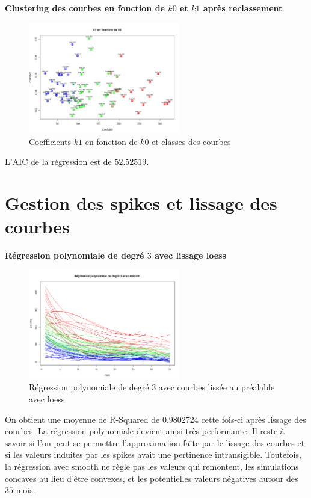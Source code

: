 \documentclass[12pt]{article}
\begin{document}
\textbf{Clustering des courbes en fonction de $k0$ et $k1$ apr\`es reclassement}

\begin{figure}[H]
 \centering %
	\includegraphics[width=250px]{clustering2}
  \caption{\label{fig:k0_k1} Coefficients $k1$ en fonction de $k0$ et classes des courbes}
\end{figure}

L'AIC de la r\'egression est de $52.52519$.


\newpage

\section{Gestion des spikes et lissage des courbes}

\textbf{R\'egression polynomiale de degr\'e $3$ avec lissage loess}

\begin{figure}[H]
 \centering %
	\includegraphics[width=250px]{reg_pol3_smooth_loess}
  \caption{\label{fig:reg_pol3_smooth_loess} R\'egression polynomiale de degr\'e 3 avec courbes liss\'ee au pr\'ealable avec loess}
\end{figure}

On obtient une moyenne de R-Squared de $0.9802724$ cette fois-ci apr\`es lissage des courbes. La r\'egression polynomiale devient ainsi tr\`es performante. Il reste \`a savoir si l'on peut se permettre l'approximation fa\^ite par le lissage des courbes et si les valeurs induites par les spikes avait une pertinence intransigible. 
\newline
Toutefois, la r\'egression avec smooth ne r\`egle pas les valeurs qui remontent, les simulations concaves au lieu d'\^etre convexes, et les potentielles valeurs n\'egatives autour des $35$ mois.
\end{document}
